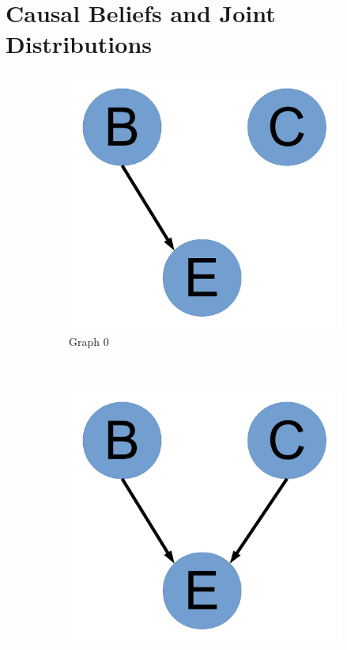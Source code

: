 \documentclass[12pt]{article}
\begin{document}
\section{Causal Beliefs and Joint Distributions}

\begin{figure}
        \centering
        \begin{subfigure}[b]{0.3\textwidth}
                \includegraphics[width=\textwidth]{Graph0.pdf}
                \caption{Graph 0}
                \label{fig:gull}
        \end{subfigure}%
        ~ %
        \begin{subfigure}[b]{0.3\textwidth}
                \includegraphics[width=\textwidth]{Graph1.pdf}

\end{subfigure}
\end{figure}
\end{document}
